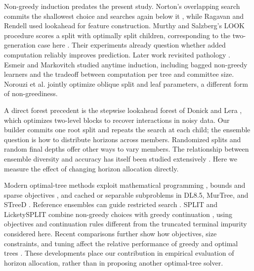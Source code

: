 \documentclass[final,5p,times]{elsarticle}
\begin{document}
Non-greedy induction predates the present study. Norton's overlapping search commits the shallowest choice and searches again below it \cite{norton1989generating}, while Ragavan and Rendell \cite{ragavan1993lookahead} used lookahead for feature construction. Murthy and Salzberg's LOOK procedure scores a split with optimally split children, corresponding to the two-generation case here \cite{murthy1995lookahead}. Their experiments already question whether added computation reliably improves prediction. Later work revisited pathology \cite{elomaa2005lookahead}. Esmeir and Markovitch \cite{esmeir2007anytime} studied anytime induction, including bagged non-greedy learners and the tradeoff between computation per tree and committee size. Norouzi et al. \cite{norouzi2015efficient} jointly optimize oblique split and leaf parameters, a different form of non-greediness.

A direct forest precedent is the stepwise lookahead forest of Donick and Lera \cite{donick2021stepwise}, which optimizes two-level blocks to recover interactions in noisy data. Our builder commits one root split and repeats the search at each child; the ensemble question is how to distribute horizons across members. Randomized splits \cite{geurts2006extremely} and random final depths \cite{horn2026randomdepth} offer other ways to vary members. The relationship between ensemble diversity and accuracy has itself been studied extensively \cite{kuncheva2003diversity}. Here we measure the effect of changing horizon allocation directly.

Modern optimal-tree methods exploit mathematical programming \cite{bertsimas2017optimal,verwer2019learning,aghaei2025strong}, bounds and sparse objectives \cite{hu2019optimal,lin2020generalized}, and cached or separable subproblems in DL8.5, MurTree, and STreeD \cite{aglin2020caching,demirovic2022murtree,vanderlinden2023separable}. Reference ensembles can guide restricted search \cite{mctavish2022reference}. SPLIT and LicketySPLIT combine non-greedy choices with greedy continuation \cite{babbar2025nearoptimal}, using objectives and continuation rules different from the truncated terminal impurity considered here. Recent comparisons further show how objectives, size constraints, and tuning affect the relative performance of greedy and optimal trees \cite{vanderlinden2026optimalgreedy}. These developments place our contribution in empirical evaluation of horizon allocation, rather than in proposing another optimal-tree solver.
\end{document}
